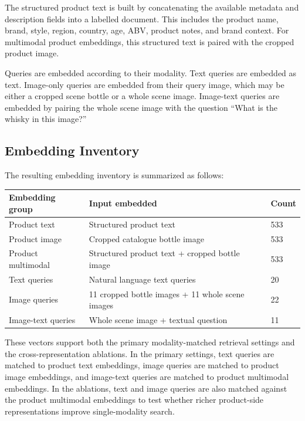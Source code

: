 The structured product text is built by concatenating the available metadata and description fields into a labelled document. This includes the product name, brand, style, region, country, age, ABV, product notes, and brand context. For multimodal product embeddings, this structured text is paired with the cropped product image.

Queries are embedded according to their modality. Text queries are embedded as text. Image-only queries are embedded from their query image, which may be either a cropped scene bottle or a whole scene image. Image-text queries are embedded by pairing the whole scene image with the question ``What is the whisky in this image?''

\subsection{Embedding Inventory}

The resulting embedding inventory is summarized as follows:

\begin{center}
\begin{tabular}{lll}
\hline
\textbf{Embedding group} & \textbf{Input embedded} & \textbf{Count} \\
\hline
Product text & Structured product text & 533 \\
Product image & Cropped catalogue bottle image & 533 \\
Product multimodal & Structured product text + cropped bottle image & 533 \\
Text queries & Natural language text queries & 20 \\
Image queries & 11 cropped bottle images + 11 whole scene images & 22 \\
Image-text queries & Whole scene image + textual question & 11 \\
\hline
\end{tabular}
\end{center}

These vectors support both the primary modality-matched retrieval settings and the cross-representation ablations. In the primary settings, text queries are matched to product text embeddings, image queries are matched to product image embeddings, and image-text queries are matched to product multimodal embeddings. In the ablations, text and image queries are also matched against the product multimodal embeddings to test whether richer product-side representations improve single-modality search.
